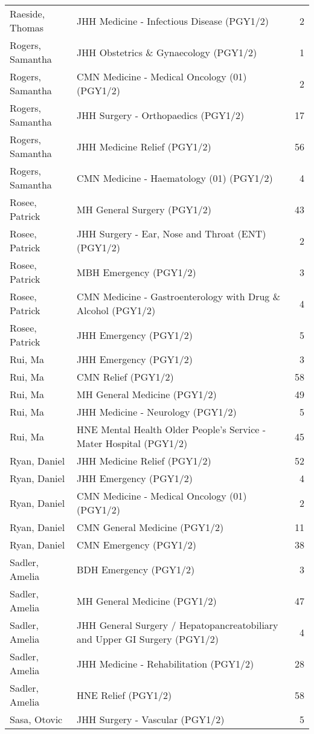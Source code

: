\documentclass[
]{article}
\begin{document}
\begin{longtable}{llr}
Raeside, Thomas & JHH Medicine - Infectious Disease (PGY1/2) & 2 \\ 
Rogers, Samantha & JHH Obstetrics \& Gynaecology (PGY1/2) & 1 \\ 
Rogers, Samantha & CMN Medicine - Medical Oncology (01) (PGY1/2) & 2 \\ 
Rogers, Samantha & JHH Surgery - Orthopaedics (PGY1/2) & 17 \\ 
Rogers, Samantha & JHH Medicine Relief (PGY1/2) & 56 \\ 
Rogers, Samantha & CMN Medicine - Haematology (01) (PGY1/2) & 4 \\ 
Rosee, Patrick & MH General Surgery (PGY1/2) & 43 \\ 
Rosee, Patrick & JHH Surgery - Ear, Nose and Throat (ENT) (PGY1/2) & 2 \\ 
Rosee, Patrick & MBH Emergency (PGY1/2) & 3 \\ 
Rosee, Patrick & CMN Medicine - Gastroenterology with Drug \& Alcohol (PGY1/2) & 4 \\ 
Rosee, Patrick & JHH Emergency (PGY1/2) & 5 \\ 
Rui, Ma & JHH Emergency (PGY1/2) & 3 \\ 
Rui, Ma & CMN Relief (PGY1/2) & 58 \\ 
Rui, Ma & MH General Medicine (PGY1/2) & 49 \\ 
Rui, Ma & JHH Medicine - Neurology (PGY1/2) & 5 \\ 
Rui, Ma & HNE Mental Health Older People's Service - Mater Hospital (PGY1/2) & 45 \\ 
Ryan, Daniel & JHH Medicine Relief (PGY1/2) & 52 \\ 
Ryan, Daniel & JHH Emergency (PGY1/2) & 4 \\ 
Ryan, Daniel & CMN Medicine - Medical Oncology (01) (PGY1/2) & 2 \\ 
Ryan, Daniel & CMN General Medicine (PGY1/2) & 11 \\ 
Ryan, Daniel & CMN Emergency (PGY1/2) & 38 \\ 
Sadler, Amelia & BDH Emergency (PGY1/2) & 3 \\ 
Sadler, Amelia & MH General Medicine (PGY1/2) & 47 \\ 
Sadler, Amelia & JHH General Surgery / Hepatopancreatobiliary and Upper GI Surgery (PGY1/2) & 4 \\ 
Sadler, Amelia & JHH Medicine - Rehabilitation (PGY1/2) & 28 \\ 
Sadler, Amelia & HNE Relief (PGY1/2) & 58 \\ 
Sasa, Otovic & JHH Surgery - Vascular (PGY1/2) & 5 \\ 

\end{longtable}
\end{document}
